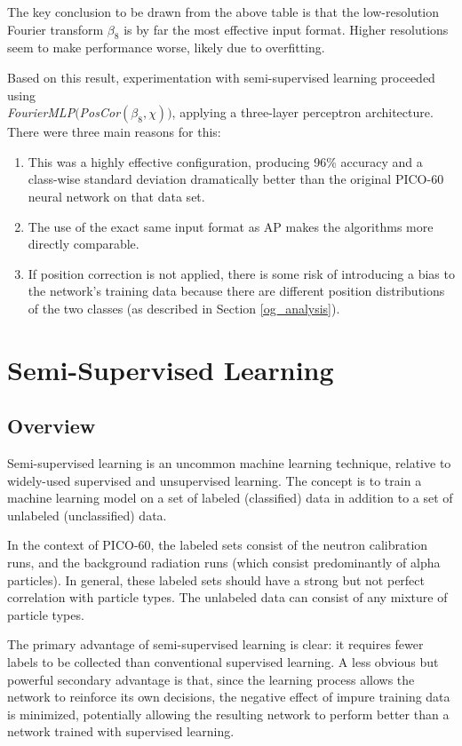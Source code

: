 \documentclass[10pt]{article}
\begin{document}
The key conclusion to be drawn from the above table is that the low-resolution Fourier transform $\beta_{8}$ is by far the most effective input format. Higher resolutions seem to make performance worse, likely due to overfitting.

Based on this result, experimentation with semi-supervised learning proceeded using \\ {\it FourierMLP}$(${\it PosCor}$(\beta_{8}, \chi))$, applying a three-layer perceptron architecture. There were three main reasons for this:

\begin{enumerate}
    \item This was a highly effective configuration, producing 96\% accuracy and a class-wise standard deviation dramatically better than the original PICO-60 neural network on that data set.
    \item The use of the exact same input format as AP makes the algorithms more directly comparable.
    \item If position correction is not applied, there is some risk of introducing a bias to the network's training data because there are different position distributions of the two classes (as described in Section \ref{og_analysis}).
\end{enumerate}

\section{Semi-Supervised Learning} \label{semi_supervised}

\subsection{Overview}

Semi-supervised learning is an uncommon machine learning technique, relative to widely-used supervised and unsupervised learning. The concept is to train a machine learning model on a set of labeled (classified) data in addition to a set of unlabeled (unclassified) data.

In the context of PICO-60, the labeled sets consist of the neutron calibration runs, and the background radiation runs (which consist predominantly of alpha particles). In general, these labeled sets should have a strong but not perfect correlation with particle types. The unlabeled data can consist of any mixture of particle types.

The primary advantage of semi-supervised learning is clear: it requires fewer labels to be collected than conventional supervised learning. A less obvious but powerful secondary advantage is that, since the learning process allows the network to reinforce its own decisions, the negative effect of impure training data is minimized, potentially allowing the resulting network to perform better than a network trained with supervised learning.
\end{document}
